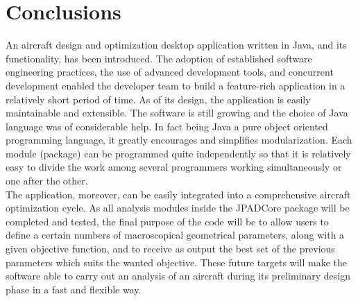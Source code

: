 \chapter*{Conclusions}
An aircraft design and optimization desktop application written in Java, and its functionality, has been introduced. The adoption of established software engineering practices, the use of advanced development tools, and concurrent development enabled the developer team to build a feature-rich application in a relatively short period of time. As of its design, the application is easily maintainable and extensible. The software is still growing and the choice of Java language was of considerable help. In fact being Java a pure object oriented programming language, it greatly encourages and simplifies modularization. Each module (package) can be programmed quite independently so that it is relatively easy to divide the work among several programmers working simultaneously or one after the other.\\
The application, moreover, can be easily integrated into a comprehensive aircraft optimization cycle. As all analysis modules inside the JPADCore package will be completed and tested, the final purpose of the code will be to allow users to define a certain numbers of macroscopical geometrical parameters, along with a given objective function, and to receive as output the best set of the previous parameters which suits the wanted objective. These future targets will make the software able to carry out an analysis of an aircraft during its preliminary design phase in a fast and flexible way.